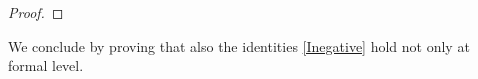 \documentclass[reqno,11pt]{amsart}
\theoremstyle{plain}
\numberwithin{equation}{section}
\newcommand{\I}{{\texttt{\bf J}}}
\newcommand{\cI}{{\mathcal I}}
\begin{document}
{\begin{proof}
% 

%	
%	
%	
\end{proof}
We conclude by proving that also the identities \eqref{Inegative} hold not only at formal level.
}
\end{document}

